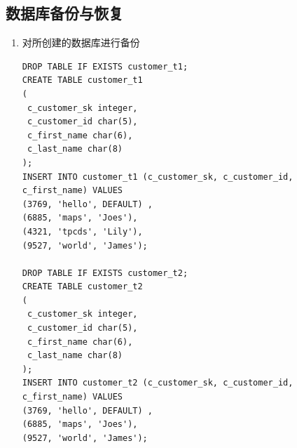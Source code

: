 \subsection{数据库备份与恢复}
\begin{enumerate}
  \item 对所创建的数据库进行备份
\begin{center}
\begin{verbatim}
DROP TABLE IF EXISTS customer_t1;
CREATE TABLE customer_t1
(
 c_customer_sk integer,
 c_customer_id char(5),
 c_first_name char(6),
 c_last_name char(8)
);
INSERT INTO customer_t1 (c_customer_sk, c_customer_id, c_first_name) VALUES
(3769, 'hello', DEFAULT) ,
(6885, 'maps', 'Joes'),
(4321, 'tpcds', 'Lily'),
(9527, 'world', 'James');

DROP TABLE IF EXISTS customer_t2;
CREATE TABLE customer_t2
(
 c_customer_sk integer,
 c_customer_id char(5),
 c_first_name char(6),
 c_last_name char(8)
);
INSERT INTO customer_t2 (c_customer_sk, c_customer_id, c_first_name) VALUES
(3769, 'hello', DEFAULT) ,
(6885, 'maps', 'Joes'),
(9527, 'world', 'James');


\end{verbatim}
\end{center}
\end{enumerate}
